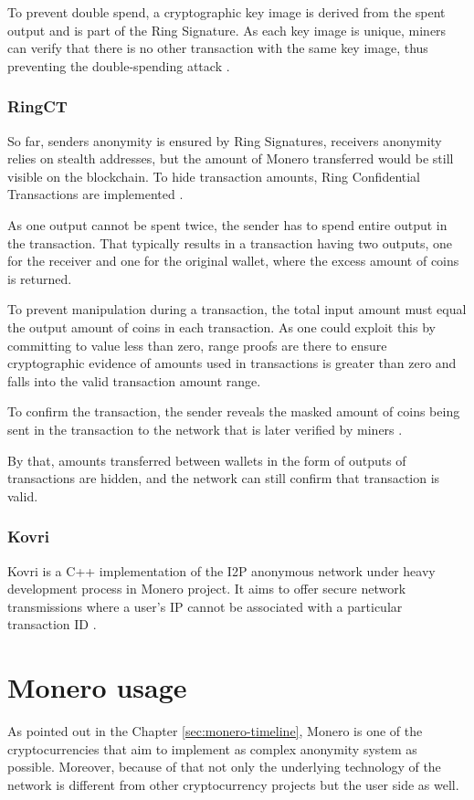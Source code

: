 \documentclass[
  printed, %
  table,   %
  nolof,     %
  nolot,     %
           oneside, color
]{fithesis3}
\begin{document}
To prevent double spend, a cryptographic key image is derived from the spent output and is part of the Ring Signature. As each key image is unique, miners can verify that there is no other transaction with the same key image, thus preventing the double-spending attack \cite{miller2017empirical}.

\subsection{RingCT}
\label{sec:ringct}
So far, senders anonymity is ensured by Ring Signatures, receivers anonymity relies on stealth addresses, but the amount of Monero transferred would be still visible on the blockchain. To hide transaction amounts, Ring Confidential Transactions are implemented \cite{noether2015ring}.

As one output cannot be spent twice, the sender has to spend entire output in the transaction. That typically results in a transaction having two outputs, one for the receiver and one for the original wallet, where the excess amount of coins is returned.	 

To prevent manipulation during a transaction, the total input amount must equal the output amount of coins in each transaction. As one could exploit this by committing to value less than zero, range proofs are there to ensure cryptographic evidence of amounts used in transactions is greater than zero and falls into the valid transaction amount range. 

To confirm the transaction, the sender reveals the masked amount of coins being sent in the transaction to the network that is later verified by miners \cite{sun2017ringct}. 

By that, amounts transferred between wallets in the form of outputs of transactions are hidden, and the network can still confirm that transaction is valid.

\subsection{Kovri}
Kovri is a C++ implementation of the I2P anonymous network under heavy development process in Monero project. It aims to offer secure network transmissions where a user's IP cannot be associated with a particular transaction ID \cite{monerokovri}. 

\chapter{Monero usage}
As pointed out in the Chapter \ref{sec:monero-timeline}, Monero is one of the cryptocurrencies that aim to implement as complex anonymity system as possible. Moreover, because of that not only the underlying technology of the network is different from other cryptocurrency projects but the user side as well. 
\end{document}
